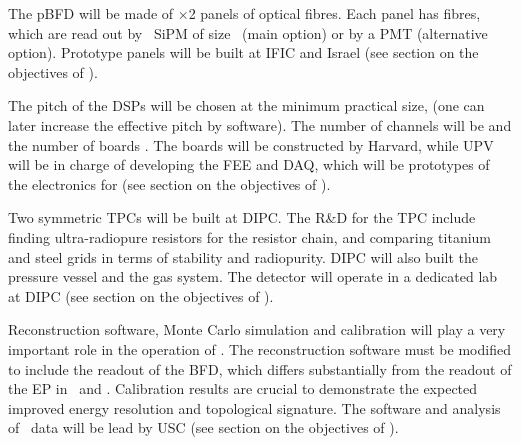 \indent

The pBFD will be made of \pBFDNP$\times$2 panels of optical fibres. Each panel has \pBFDNFPP fibres, which are read out by \pBFDNSIPMPP\ SiPM
of size \pBFDNSIPM\ (main option) or by a PMT (alternative option). Prototype panels will be built at IFIC and Israel (see section on the objectives of \sIFIC).

\indent


The pitch of the DSPs will be chosen at the minimum practical size, \pDSP (one can later increase the effective pitch by software). The number of channels will be \pDSPC and the number of boards \pDSPB.  The boards will be constructed by Harvard, while UPV will be in charge of developing the FEE and DAQ, which will be prototypes of the electronics for \NHD (see section on the objectives of \sUPV).

\indent

Two symmetric TPCs will be built at DIPC. The R\&D for the TPC include finding ultra-radiopure resistors for the resistor chain, and comparing titanium and
steel grids in terms of stability and radiopurity. DIPC will also built the pressure vessel and the gas system. The detector will operate in a dedicated lab at DIPC (see section on the objectives of \sDIPC).

\indent

Reconstruction software, Monte Carlo simulation and calibration will play a very important role in the operation of \HDEMO. The reconstruction software must be modified to include the readout of the BFD, which differs substantially from the readout of the EP in \NEW\ and \Next. Calibration results are crucial to demonstrate the expected improved energy resolution and topological signature. The software and analysis of \HDEMO\ data will be lead by USC  (see section on the objectives of \sUSC).



